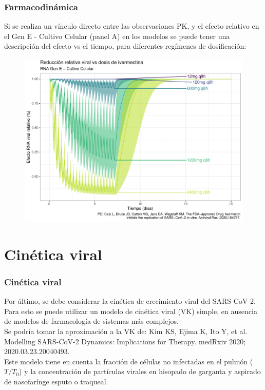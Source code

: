 \documentclass[12pt,xcolor=dvipsnames]{beamer}
\begin{document}
	\begin{frame}	
		\frametitle{Farmacodinámica}	
		\scriptsize Si se realiza un vínculo directo entre las observaciones PK, y el efecto relativo en el Gen E - Cultivo Celular (panel A) en los modelos se puede tener una descripción del efecto vs el tiempo, para diferentes regímenes de dosificación:	\\
		\begin{figure}
			\centering
			\includegraphics[width=0.78\linewidth]{../modelo_PD_2/figuras/G2}
			\label{fig:g1}
		\end{figure}
	\end{frame}
	
	\section{Cinética viral}
	\begin{frame}
		\frametitle{Cinética viral}
		\footnotesize Por último, se debe considerar la cinética de crecimiento viral del SARS-CoV-2. Para esto se puede utilizar un modelo de cinética viral (VK) simple, en ausencia de modelos de farmacología de sistemas más complejos. \\
		\vspace{2em}
		Se podría tomar la aproximación a la VK de: Kim KS, Ejima K, Ito Y, et al. Modelling SARS-CoV-2 Dynamics: Implications for Therapy. medRxiv 2020; 2020.03.23.20040493.\\
		\vspace{2em}
		Este modelo tiene en cuenta la fracción de células no infectadas en el pulmón ($T/T_0$) y la concentración de partículas virales en hisopado de garganta y aspirado de nasofarínge esputo o traqueal.
	\end{frame}
	
\end{document}
